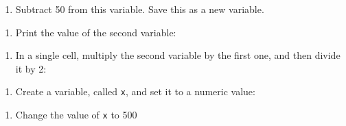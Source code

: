 \documentclass[
  letterpaper,
  DIV=11,
  numbers=noendperiod]{scrreprt}
\newenvironment{Shaded}{\begin{snugshade}}{\end{snugshade}}
\providecommand{\tightlist}{%
  \setlength{\itemsep}{0pt}\setlength{\parskip}{0pt}}
\begin{document}
\begin{enumerate}
\def\labelenumi{\arabic{enumi}.}
\setcounter{enumi}{1}
\tightlist
\item
  Subtract 50 from this variable. Save this as a new variable.
\end{enumerate}

\begin{Shaded}
\begin{Highlighting}[]

\end{Highlighting}
\end{Shaded}

\begin{enumerate}
\def\labelenumi{\arabic{enumi}.}
\setcounter{enumi}{2}
\tightlist
\item
  Print the value of the second variable:
\end{enumerate}

\begin{Shaded}
\begin{Highlighting}[]

\end{Highlighting}
\end{Shaded}

\begin{enumerate}
\def\labelenumi{\arabic{enumi}.}
\setcounter{enumi}{3}
\tightlist
\item
  In a single cell, multiply the second variable by the first one, and
  then divide it by 2:
\end{enumerate}

\begin{Shaded}
\begin{Highlighting}[]

\end{Highlighting}
\end{Shaded}

\begin{enumerate}
\def\labelenumi{\arabic{enumi}.}
\setcounter{enumi}{4}
\tightlist
\item
  Create a variable, called \texttt{x}, and set it to a numeric value:
\end{enumerate}

\begin{Shaded}
\begin{Highlighting}[]

\end{Highlighting}
\end{Shaded}

\begin{enumerate}
\def\labelenumi{\arabic{enumi}.}
\setcounter{enumi}{5}
\tightlist
\item
  Change the value of \texttt{x} to 500
\end{enumerate}
\end{document}
